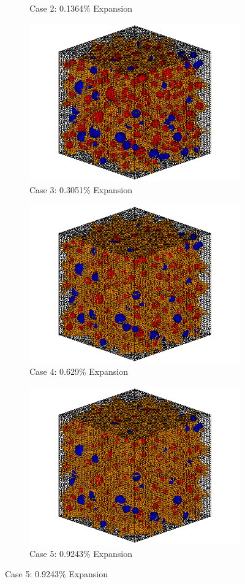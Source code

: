 \begin{figure}[!h]
\begin{subfigure}{.5\textwidth}
    \caption{Case 2: 0.1364\% Expansion}
    \end{subfigure}%
    \begin{subfigure}{.5\textwidth}
      \centering
      \includegraphics[width=.8\linewidth]{Files/exp_3D/ASR/A15P75_3_c.png}
    \caption{Case 3: 0.3051\% Expansion}
    \end{subfigure}
    \begin{subfigure}{.5\textwidth}
      \centering
      \includegraphics[width=.8\linewidth]{Files/exp_3D/ASR/A15P75_4_c.png}
    \caption{Case 4: 0.629\% Expansion}
    \end{subfigure}%
    \begin{subfigure}{.5\textwidth}
      \centering
      \includegraphics[width=.8\linewidth]{Files/exp_3D/ASR/A15P75_5_c.png}
    \caption{Case 5: 0.9243\% Expansion}
    \end{subfigure}


\end{figure}
